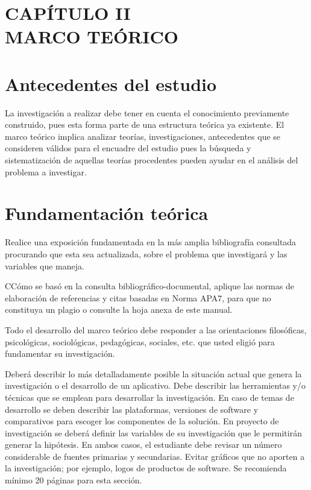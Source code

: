 \documentclass[12pt, a4paper, nofontenc, numbers=endperiod]{apa7}
\begin{document}
\newpage
{
	\setlength\headsep{2.95cm}
	\addtolength{\textheight}{-2.45cm}
	\section*{\large \centering CAPÍTULO II \\ MARCO TEÓRICO}
	\section{\normalsize \centering Antecedentes del estudio}
	{\setlength{\parindent}{1.27cm}La investigación a realizar debe tener en cuenta el conocimiento previamente construido, pues esta forma parte de una estructura teórica ya existente. El marco teórico implica analizar teorías, investigaciones, antecedentes que se consideren válidos para el encuadre del estudio pues la búsqueda y sistematización de aquellas teorías procedentes pueden ayudar en el análisis del problema a investigar.}
	\section{\normalsize  \centering Fundamentación teórica}
	
	\setlength{\parindent}{1.27cm} Realice una exposición fundamentada en la más amplia bibliografía consultada procurando que esta sea actualizada, sobre el problema que investigará y las variables que maneja.
	
	\setlength{\parindent}{1.27cm}  CCómo se basó en la consulta bibliográfico-documental, aplique las normas de elaboración de referencias y citas basadas en Norma APA7, para que no constituya un plagio o consulte la hoja anexa de este manual.
	
	\setlength{\parindent}{1.27cm} Todo el desarrollo del marco teórico debe responder a las orientaciones filosóficas, psicológicas, sociológicas, pedagógicas, sociales, etc. que usted eligió para fundamentar su investigación.
	
	\setlength{\parindent}{1.27cm} Deberá describir lo más detalladamente posible la situación actual que genera la investigación o el desarrollo de un aplicativo. Debe describir las herramientas y/o técnicas que se emplean para desarrollar la investigación. En caso de temas de desarrollo se deben \hspace{0.1cm} describir
	\newpage
	\restoregeometry
	\justify
	 las plataformas, versiones de software y comparativos para escoger los componentes de la solución. En proyecto de investigación se deberá definir 
	las variables de su investigación que le permitirán generar la hipótesis. En ambos casos, el estudiante debe revisar un número considerable de fuentes primarias y secundarias.  Evitar gráficos que no aporten a la investigación; por ejemplo, logos de productos de software. Se recomienda mínimo 20 páginas para esta sección. \\
	
}
\end{document}
